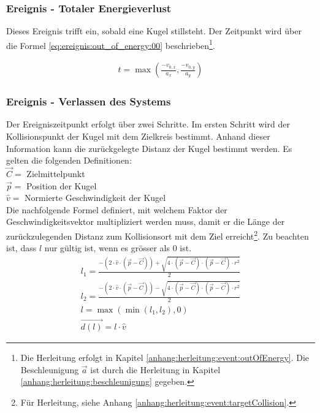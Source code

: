 \subsubsection{Ereignis - Totaler Energieverlust}
Dieses Ereignis trifft ein, sobald eine Kugel stillsteht. Der Zeitpunkt wird über die Formel \ref{eq:ereignis:out_of_energy:00}
beschrieben\footnote{Die Herleitung erfolgt in Kapitel \ref{anhang:herleitung:event:outOfEnergy}.
Die Beschleunigung $\vec{a}$ ist durch die Herleitung in Kapitel \ref{anhang:herleitung:beschleunigung}
gegeben.}.

\begin{align}
    t = \max{(\frac{-v_{0,x}}{a_x}, \frac{-v_{0,y}}{a_y})}\label{eq:ereignis:out_of_energy:00}
\end{align}

\subsubsection{Ereignis - Verlassen des Systems}
Der Ereigniszeitpunkt erfolgt über zwei Schritte. Im ersten Schritt wird der Kollisionspunkt der Kugel mit dem
Zielkreis bestimmt. Anhand dieser Information kann die zurückgelegte Distanz der Kugel bestimmt werden.
Es gelten die folgenden Definitionen:\\
$\vec{C} = $ Zielmittelpunkt\\
$\vec{p} = $ Position der Kugel\\
$\hat{v} = $ Normierte Geschwindigkeit der Kugel\\

Die nachfolgende Formel definiert, mit welchem Faktor der Geschwindigkeitsvektor multipliziert werden muss, damit
er die Länge der zurückzulegenden Distanz zum Kollisionsort mit dem Ziel erreicht\footnote{
Für Herleitung, siehe Anhang \ref{anhang:herleitung:event:targetCollision}.}. Zu beachten ist, dass $l$ nur gültig ist,
wenn es grösser als $0$ ist.
\begin{align}
    l_1 = \frac{-(2 \cdot \hat{v} \cdot (\vec{p} - \vec{C})) + \sqrt{4 \cdot (\vec{p} - \vec{C}) \cdot (\vec{p} - \vec{C}) \cdot r^2}}{2}\\
    l_2 = \frac{-(2 \cdot \hat{v} \cdot (\vec{p} - \vec{C})) - \sqrt{4 \cdot (\vec{p} - \vec{C}) \cdot (\vec{p} - \vec{C}) \cdot r^2}}{2}\\
    l = \max{(\min{(l_1, l_2)}, 0)}\\
    \vec{d(l)} = l \cdot \hat{v}
\end{align}

